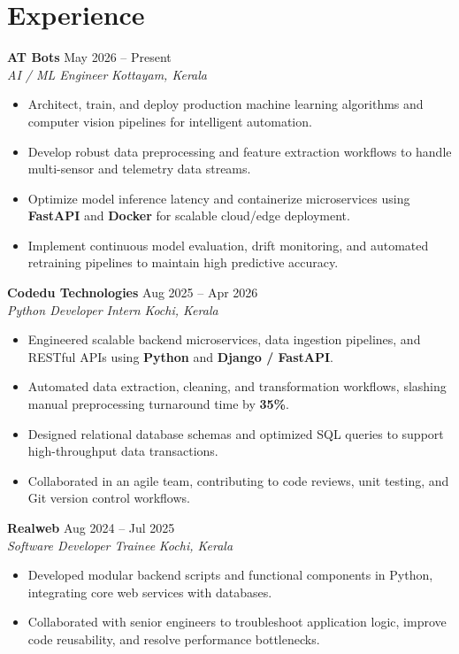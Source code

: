 \documentclass[letterpaper,9.5pt]{article}
\newcommand{\resumeItem}[1]{
  \item\small{
    {#1 \vspace{-2.5pt}}
  }
}
\begin{document}
\section{Experience}

  \textbf{AT Bots} \hfill May 2026 -- Present \\
  \textit{\small AI / ML Engineer} \hfill \textit{\small Kottayam, Kerala}
  \begin{itemize}
    \resumeItem{Architect, train, and deploy production machine learning algorithms and computer vision pipelines for intelligent automation.}
    \resumeItem{Develop robust data preprocessing and feature extraction workflows to handle multi-sensor and telemetry data streams.}
    \resumeItem{Optimize model inference latency and containerize microservices using \textbf{FastAPI} and \textbf{Docker} for scalable cloud/edge deployment.}
    \resumeItem{Implement continuous model evaluation, drift monitoring, and automated retraining pipelines to maintain high predictive accuracy.}
  \end{itemize}

  \vspace{2pt}
  \textbf{Codedu Technologies} \hfill Aug 2025 -- Apr 2026 \\
  \textit{\small Python Developer Intern} \hfill \textit{\small Kochi, Kerala}
  \begin{itemize}
    \resumeItem{Engineered scalable backend microservices, data ingestion pipelines, and RESTful APIs using \textbf{Python} and \textbf{Django / FastAPI}.}
    \resumeItem{Automated data extraction, cleaning, and transformation workflows, slashing manual preprocessing turnaround time by \textbf{35\%}.}
    \resumeItem{Designed relational database schemas and optimized SQL queries to support high-throughput data transactions.}
    \resumeItem{Collaborated in an agile team, contributing to code reviews, unit testing, and Git version control workflows.}
  \end{itemize}

  \vspace{2pt}
  \textbf{Realweb} \hfill Aug 2024 -- Jul 2025 \\
  \textit{\small Software Developer Trainee} \hfill \textit{\small Kochi, Kerala}
  \begin{itemize}
    \resumeItem{Developed modular backend scripts and functional components in Python, integrating core web services with databases.}
    \resumeItem{Collaborated with senior engineers to troubleshoot application logic, improve code reusability, and resolve performance bottlenecks.}
  \end{itemize}
\vspace{-2pt}
\end{document}
